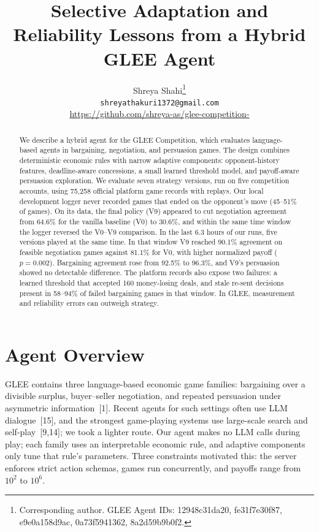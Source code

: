 \documentclass{article}
\title{Selective Adaptation and Reliability Lessons from a Hybrid GLEE Agent}
\author{%
Shreya Shahi\thanks{Corresponding author. GLEE Agent IDs: 12948c31da20, fe31f7e30f87, e9e0a158d9ac, 0a73f5941362, 8a2d59b9b0f2.} \\
\texttt{shreyathakuri1372@gmail.com} \\
\url{https://github.com/shreya-as/glee-competition-}
}
\begin{document}
\maketitle

\begin{abstract}
We describe a hybrid agent for the GLEE Competition, which evaluates language-based agents in bargaining, negotiation, and persuasion games. The design combines deterministic economic rules with narrow adaptive components: opponent-history features, deadline-aware concessions, a small learned threshold model, and payoff-aware persuasion exploration. We evaluate seven strategy versions, run on five competition accounts, using 75{,}258 official platform game records with replays. Our local development logger never recorded games that ended on the opponent's move (45--51\% of games). On its data, the final policy (V9) appeared to cut negotiation agreement from 64.6\% for the vanilla baseline (V0) to 30.6\%, and within the same time window the logger reversed the V0--V9 comparison. In the last 6.3 hours of our runs, five versions played at the same time. In that window V9 reached 90.1\% agreement on feasible negotiation games against 81.1\% for V0, with higher normalized payoff ($p=0.002$). Bargaining agreement rose from 92.5\% to 96.3\%, and V9's persuasion showed no detectable difference. The platform records also expose two failures: a learned threshold that accepted 160 money-losing deals, and stale re-sent decisions present in 58--94\% of failed bargaining games in that window. In GLEE, measurement and reliability errors can outweigh strategy.
\end{abstract}

\section{Agent Overview}

GLEE contains three language-based economic game families: bargaining over a divisible surplus, buyer--seller negotiation, and repeated persuasion under asymmetric information~[1]. Recent agents for such settings often use LLM dialogue~[15], and the strongest game-playing systems use large-scale search and self-play~[9,14]; we took a lighter route. Our agent makes no LLM calls during play; each family uses an interpretable economic rule, and adaptive components only tune that rule's parameters. Three constraints motivated this: the server enforces strict action schemas, games run concurrently, and payoffs range from $10^2$ to $10^6$.
\end{document}
